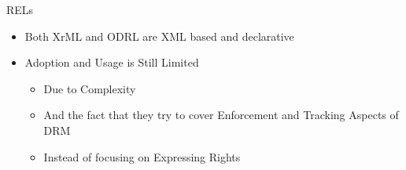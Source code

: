 \documentclass{beamer}
\begin{document}
\begin{frame}[fragile]{RELs}
\LARGE
\begin{itemize}
\item Both XrML and ODRL are XML based and declarative
\item Adoption and Usage is Still Limited
   \begin{itemize}
   \item Due to Complexity 
   \item And the fact that they try to cover Enforcement and Tracking Aspects of DRM
   \item Instead of focusing on Expressing Rights
   \end{itemize}
\end{itemize}
\end{frame}
\end{document}
